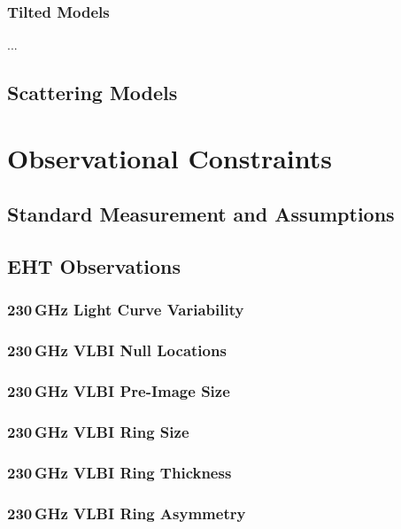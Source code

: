 \documentclass[twocolumn,twocolappendix,tighten,dvipsnames,linenumbers]{aastex63}
\begin{document}
\subsubsection{Tilted Models}

...

\subsection{Scattering Models}

\clearpage

\section{Observational Constraints}

\subsection{Standard Measurement and Assumptions}

\subsection{EHT Observations}
\subsubsection{230\,GHz Light Curve Variability}
\subsubsection{230\,GHz VLBI Null Locations}
\subsubsection{230\,GHz VLBI Pre-Image Size}
\subsubsection{230\,GHz VLBI Ring Size}
\subsubsection{230\,GHz VLBI Ring Thickness}
\subsubsection{230\,GHz VLBI Ring Asymmetry}
\end{document}
